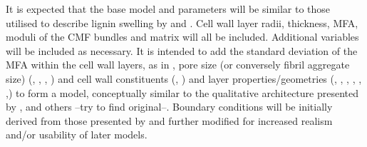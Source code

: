 It is expected that the base model and parameters will be similar to those
utilised to describe lignin swelling by \cite{Alm_ras_2005} and \cite{Yamamoto_1998}. Cell wall layer radii, thickness, MFA, moduli of the CMF bundles and matrix will all be included. Additional variables will be included
as necessary. It is intended to add the standard deviation of the MFA within the
cell wall layers, as in \cite{Harrington_1998}, pore size (or conversely fibril
aggregate size) (\cite{Fahl_n_2005}, \cite{Chang_2014}, \cite{BIORESBioRes_07_1_0521_Salmen_OSSR_Struc_Organis_Wood_Polymers}, \cite{Kim_2011}) and cell wall
constituents (\cite{Baba_2009}, \cite{Donaldson_2001}) and layer properties/geometries
(\cite{Bergander_2002}, \cite{grozdits1984differentiation}, \cite{Alm_ras_2005},  \cite{Yamamoto_1998}, \cite{Chang_2014}, \cite{ISI:A1995QJ03000001},) to form a model, conceptually similar to the qualitative
architecture presented by \cite{Mellerowicz_2011}, \cite{Salm_n_2009} and others --try
to find original--. Boundary conditions will be initially derived from those
presented by \cite{Alm_ras_2005} and further modified for increased realism
and/or usability of later models.